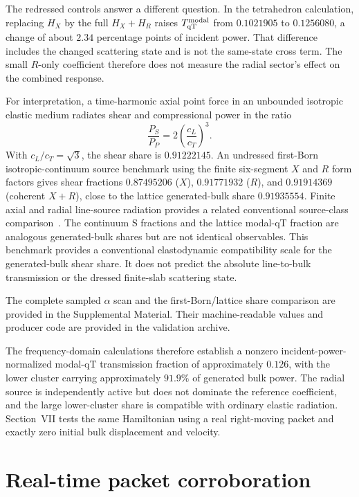 \documentclass[10pt,aps,pre,reprint,floatfix,notitlepage,nofootinbib]{revtex4-2}
\newcommand{\qT}{\mathrm{qT}}
\begin{document}
The redressed controls answer a different question. In the tetrahedron calculation, replacing $H_X$ by the full $H_X+H_R$ raises $T_{\qT}^{\rm modal}$ from $0.1021905$ to $0.1256080$, a change of about $2.34$ percentage points of incident power. That difference includes the changed scattering state and is not the same-state cross term. The small $R$-only coefficient therefore does not measure the radial sector's effect on the combined response.

For interpretation, a time-harmonic axial point force in an unbounded isotropic elastic medium radiates shear and compressional power in the ratio~\cite{Achenbach1973,Graff1975}
\begin{equation}
 \frac{P_S}{P_P}=2\left(\frac{c_L}{c_T}\right)^3.
 \label{eq:s6-point-force}
\end{equation}
With $c_L/c_T=\sqrt3$, the shear share is $0.91222145$.  An undressed first-Born isotropic-continuum source benchmark using the finite six-segment $X$ and $R$ form factors gives shear fractions $0.87495206$ ($X$), $0.91771932$ ($R$), and $0.91914369$ (coherent $X+R$), close to the lattice generated-bulk share $0.91935554$. Finite axial and radial line-source radiation provides a related conventional source-class comparison~\cite{Aldridge1998}. The continuum S fractions and the lattice modal-qT fraction are analogous generated-bulk shares but are not identical observables. This benchmark provides a conventional elastodynamic compatibility scale for the generated-bulk shear share. It does not predict the absolute line-to-bulk transmission or the dressed finite-slab scattering state.

The complete sampled $\alpha$ scan and the first-Born/lattice share comparison are provided in the Supplemental Material. Their machine-readable values and producer code are provided in the validation archive.


The frequency-domain calculations therefore establish a nonzero incident-power-normalized modal-qT transmission fraction of approximately $0.126$, with the lower cluster carrying approximately $91.9\%$ of generated bulk power.  The radial source is independently active but does not dominate the reference coefficient, and the large lower-cluster share is compatible with ordinary elastic radiation.  Section~VII tests the same Hamiltonian using a real right-moving packet and exactly zero initial bulk displacement and velocity.

\section{Real-time packet corroboration}
\label{sec:s7-direct}
\end{document}
